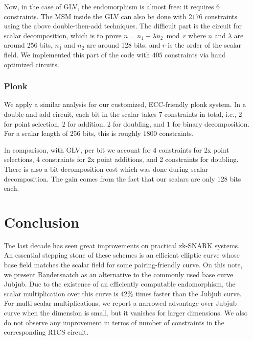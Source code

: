 \documentclass[smallextended]{svjour3}
\begin{document}
Now, in the case of GLV,
the endomorphism is almost free: it requires 
6 constraints. The MSM inside the GLV can also be done 
with $2176$ constraints using the above double-then-add
techniques.
The difficult part is the circuit for scalar decomposition,
which is to prove $n = n_1 +\lambda n_2 \bmod r$ where
$n$ and $\lambda$ are around 256 bits,
$n_1$ and $n_2$ are around 128 bits, and
$r$
is the order of the scalar field.
We implemented this part of the code with $405$ constraints
via hand optimized circuits.

\subsubsection{Plonk}
We apply a similar analysis for our customized, ECC-friendly 
plonk system. In a double-and-add circuit, each bit in the scalar
takes 7 constraints in total, i.e., 2 for point selection, 2 
for addition, 2 for doubling, and 1 for binary decomposition.
For a scalar length of 256 bits, this is roughly $1800$ constraints.

In comparison, with GLV, per bit we account for 4 constraints for 2x point selections,
4 constraints for 2x point additions, and 2 constraints for doubling.
There is also a bit decomposition cost which was done during scalar
decomposition. The gain comes from the fact that our scalars are only
128 bits each.



\section{Conclusion}
Tne last decade has seen great improvements on practical zk-SNARK systems.
An essential stepping stone of these schemes is an efficient elliptic
curve whose base field matches the scalar field for some pairing-friendly curve.
On this note, we present Bandersnatch as an alternative to the commonly used
base curve Jubjub. Due to the existence of an efficiently computable
endomorphism, the scalar multiplication over this curve is 42\% times
faster than the Jubjub curve.
For multi scalar multiplications, we report a narrowed advantage over Jubjub 
curve when the dimension is small, but it vanishes for larger
dimensions.
We also do not observe any improvement in terms of number of constraints in 
the corresponding R1CS circuit.





\end{document}
